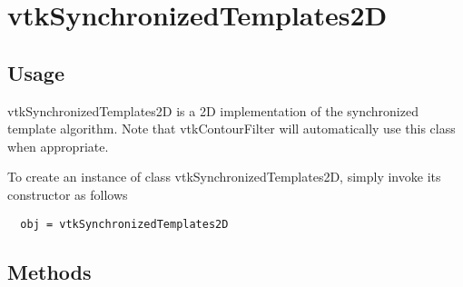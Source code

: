 \section{vtkSynchronizedTemplates2D}

\subsection{Usage}

 vtkSynchronizedTemplates2D is a 2D implementation of the synchronized 
 template algorithm. Note that vtkContourFilter will automatically
 use this class when appropriate.

To create an instance of class vtkSynchronizedTemplates2D, simply
invoke its constructor as follows
\begin{verbatim}
  obj = vtkSynchronizedTemplates2D
\end{verbatim}
\subsection{Methods}

